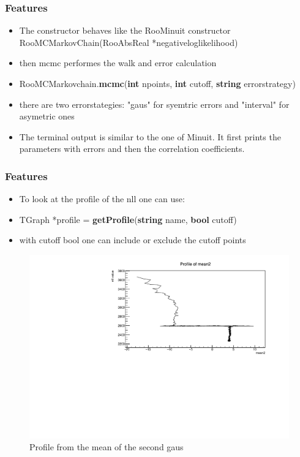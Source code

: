 \documentclass{beamer}
\begin{document}
\begin{frame}
 \frametitle{Features}
 \begin{itemize}
  \item The constructor behaves like the RooMinuit constructor RooMCMarkovChain(RooAbsReal *negativeloglikelihood)
  \item then mcmc performes the walk and error calculation
  \item RooMCMarkovchain.\textbf{mcmc}(\textbf{int} npoints, \textbf{int} cutoff, \textbf{string} errorstrategy)
  \item there are two errorstategies: "gaus" for syemtric errors and "interval" for asymetric ones
  \item The terminal output is similar to the one of Minuit. It first prints the parameters with errors and then the correlation coefficients.
 \end{itemize}
\end{frame}

\begin{frame}
 \frametitle{Features}
 \begin{itemize}
  \item To look at the profile of the nll one can use:
  \item TGraph *profile = \textbf{getProfile}(\textbf{string} name, \textbf{bool} cutoff)
  \item with cutoff bool one can include or exclude the cutoff points
 \end{itemize}

 \begin{figure}
  \includegraphics[width=0.8\linewidth]{figures/profile_mean2}
  \caption{Profile from the mean of the second gaus}
 \end{figure}

\end{frame}
\end{document}
